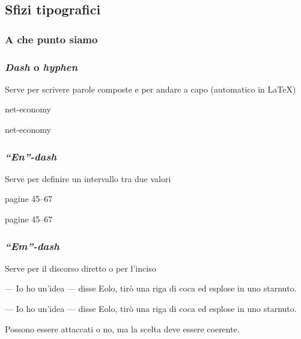 \documentclass[svgnames,%
	ucs,%
	pdftex]{guitbeamer}
\begin{document}
\subsection{Sfizi tipografici}
\begin{frame}
  \frametitle{A che punto siamo}
\end{frame}
\begin{frame}
  \frametitle{\textit{Dash} o \textit{hyphen}}
	Serve per scrivere parole composte e per andare a capo (automatico
	in \LaTeX)
	\begin{LaTeXcode}
		net\alert{-}economy
	\end{LaTeXcode}
	\begin{LaTeXoutput}
		net-economy
	\end{LaTeXoutput}
\end{frame}
\begin{frame}
  \frametitle{\textit{``En''-dash}}
	Serve per definire un intervallo tra due valori
	\begin{LaTeXcode}
		pagine 45\alert{--}67
	\end{LaTeXcode}
	\begin{LaTeXoutput}
		pagine 45--67
	\end{LaTeXoutput}
\end{frame}
\begin{frame}
  \frametitle{\textit{``Em''-dash}}
	Serve per il discorso diretto o per l'inciso
	\begin{LaTeXcode}
		\alert{---} Io ho un'idea \alert{---} disse Eolo, tir\`o una riga di
		coca ed esplose in uno starnuto. 
	\end{LaTeXcode}
	\begin{LaTeXoutput}
		--- Io ho un'idea --- disse Eolo, tir\`o una riga di coca ed esplose
		in uno starnuto.
	\end{LaTeXoutput}
  \medskip 
	Possono essere attaccati o no, ma la scelta deve essere coerente.
\end{frame}
\end{document}

